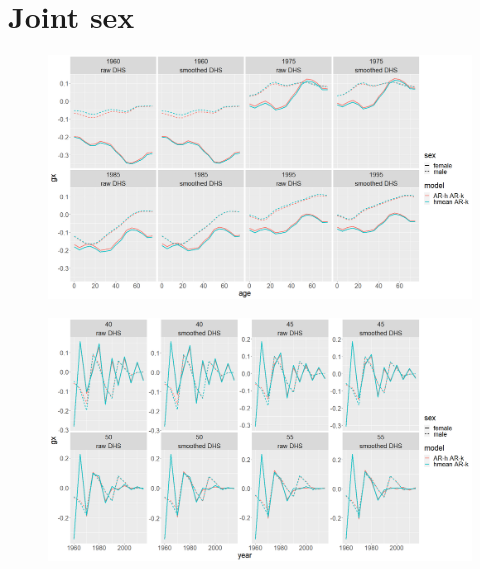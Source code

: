 \documentclass[12pt,a4paper]{article}
\begin{document}
\section*{\centering Joint sex}
\begin{figure}[H]
\includegraphics[width = \linewidth]{Burkina Faso/7/joint period mig.png}
\end{figure}
\begin{figure}[H]
\includegraphics[width = \linewidth]{Burkina Faso/7/joint age mig.png}
\end{figure}


\newpage
\end{document}
